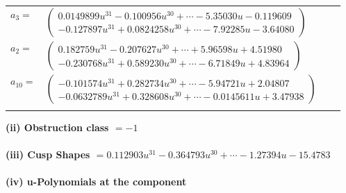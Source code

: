 \documentclass[1p]{elsarticle_modified}
\theoremstyle{definition}
\begin{document}
\begin{tabular}{m{7pt} m{180pt} m{7pt} m{180pt} }
\flushright $a_{3}=$&$\begin{pmatrix}0.0149899 u^{31}-0.100956 u^{30}+\cdots-5.35030 u-0.119609\\-0.127897 u^{31}+0.0824258 u^{30}+\cdots-7.92285 u-3.64080\end{pmatrix}$ \\
\flushright $a_{2}=$&$\begin{pmatrix}0.182759 u^{31}-0.207627 u^{30}+\cdots+5.96598 u+4.51980\\-0.230768 u^{31}+0.589230 u^{30}+\cdots-6.71849 u+4.83964\end{pmatrix}$ \\
\flushright $a_{10}=$&$\begin{pmatrix}-0.101574 u^{31}+0.282734 u^{30}+\cdots-5.94721 u+2.04807\\-0.0632789 u^{31}+0.328608 u^{30}+\cdots-0.0145611 u+3.47938\end{pmatrix}$\\&\end{tabular}
\flushleft \textbf{(ii) Obstruction class $= -1$}\\~\\
\flushleft \textbf{(iii) Cusp Shapes $= 0.112903 u^{31}-0.364793 u^{30}+\cdots-1.27394 u-15.4783$}\\~\\
\newpage\renewcommand{\arraystretch}{1}
\flushleft \textbf{(iv) u-Polynomials at the component}\newline \\
\end{document}
